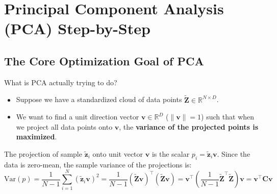 \documentclass[11pt, a4paper]{article}
\begin{document}
\clearpage

\section{Principal Component Analysis (PCA) Step-by-Step}

\subsection{The Core Optimization Goal of PCA}

What is PCA actually trying to do?
\begin{itemize}[leftmargin=1.2em]
    \item Suppose we have a standardized cloud of data points $\tilde{\mathbf{Z}} \in \mathbb{R}^{N \times D}$.
    \item We want to find a unit direction vector $\mathbf{v} \in \mathbb{R}^D$ ($\|\mathbf{v}\| = 1$) such that when we project all data points onto $\mathbf{v}$, the \textbf{variance of the projected points is maximized}.
\end{itemize}

The projection of sample $\tilde{\mathbf{z}}_i$ onto unit vector $\mathbf{v}$ is the scalar $p_i = \tilde{\mathbf{z}}_i \mathbf{v}$. Since the data is zero-mean, the sample variance of the projections is:
$$\text{Var}(p) = \frac{1}{N-1} \sum_{i=1}^N (\tilde{\mathbf{z}}_i \mathbf{v})^2 = \frac{1}{N-1} (\tilde{\mathbf{Z}}\mathbf{v})^\top (\tilde{\mathbf{Z}}\mathbf{v}) = \mathbf{v}^\top \left(\frac{1}{N-1} \tilde{\mathbf{Z}}^\top \tilde{\mathbf{Z}}\right) \mathbf{v} = \mathbf{v}^\top \mathbf{C} \mathbf{v}$$
\end{document}

